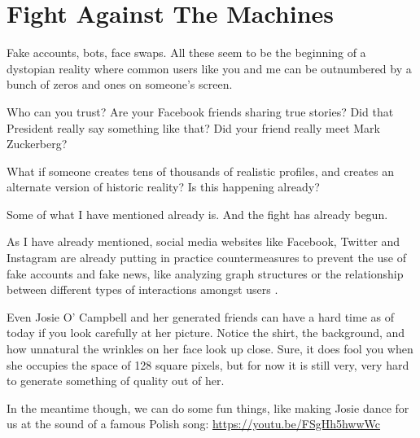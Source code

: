 \section{Fight Against The Machines}

Fake accounts, bots, face swaps. All these seem to be the beginning of a dystopian reality where common users like you and me can be outnumbered by a bunch of zeros and ones on someone's screen.

Who can you trust? Are your Facebook friends sharing true stories? Did that President really say something like that? Did your friend really meet Mark Zuckerberg?

What if someone creates tens of thousands of realistic profiles, and creates an alternate version of historic reality? Is this happening already?

Some of what I have mentioned already is. And the fight has already begun.

As I have already mentioned, social media websites like Facebook, Twitter and Instagram are already putting in practice countermeasures to prevent the use of fake accounts and fake news, like analyzing graph structures \cite{Identify5:online} or the relationship between different types of interactions amongst users \cite{Fullarti91:online}.

Even Josie O' Campbell and her generated friends can have a hard time as of today if you look carefully at her picture. Notice the shirt, the background, and how unnatural the wrinkles on her face look up close. Sure, it does fool you when she occupies the space of 128 square pixels, but for now it is still very, very hard to generate something of quality out of her.

In the meantime though, we can do some fun things, like making Josie dance for us at the sound of a famous Polish song: \url{https://youtu.be/FSgHh5hwwWc}
